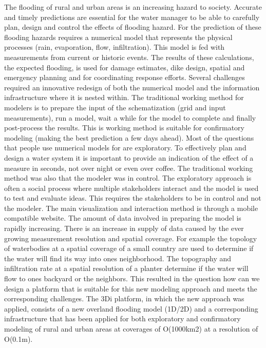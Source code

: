 \documentclass[a4paper]{article}
\begin{document}
The flooding of rural and urban areas is an increasing hazard to society. Accurate and timely predictions are essential for the water manager to be able to carefully plan, design and control the effects of flooding hazard.
For the prediction of these flooding hazards requires a numerical model that represents the physical processes (rain, evaporation, flow, infiltration). This model is fed with measurements from current or historic events. The results of these calculations, the expected flooding, is used for damage estimates, dike design, spatial and emergency planning and for coordinating response efforts.
Several challenges required an innovative redesign of both the numerical model and the information infrastructure where it is nested within.
The traditional working method for modelers is to prepare the input of the schematization (grid and input measurements), run a model, wait a while for the model to complete and finally post-process the results. This is working method is suitable for confirmatory modeling (making the best prediction a few days ahead). Most of the questions that people use numerical models for are exploratory. To effectively plan and design a water system it is important to provide an indication of the effect of a measure in seconds, not over night or even over coffee.
The traditional working method was also that the modeler was in control. The exploratory approach is often a social process where multiple stakeholders interact and the model is used to test and evaluate ideas. This requires the stakeholders to be in control and not the modeler. The main visualization and interaction method is through a mobile compatible website.
The amount of data involved in preparing the model is rapidly increasing. There is an increase in supply of data caused by the ever growing measurement resolution and spatial coverage. For example the topology of waterbodies at a spatial coverage of a small country are used to determine if the water will find its way into ones neighborhood. The topography and infiltration rate at a spatial resolution of a planter determine if the water will flow to ones backyard or the neighbors.
This resulted in the question how can we design a platform that is suitable for this new modeling approach and meets the corresponding challenges.
The 3Di platform, in which the new approach was applied, consists of a new overland flooding model (1D/2D) and a corresponding infrastructure that has been applied for both exploratory and confirmatory modeling of rural and urban areas at coverages of O(1000km2) at a resolution of O(0.1m).
\end{document}

